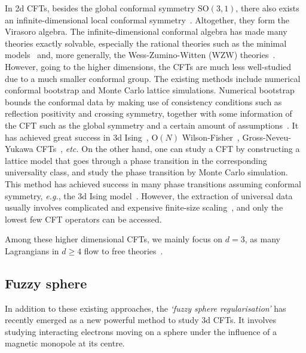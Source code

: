 \documentclass{timesjhep}
\begin{document}
In 2d CFTs, besides the global conformal symmetry $\mathrm{SO}(3,1)$, there also exists an infinite-dimensional local conformal symmetry~\cite{DiFrancesco1997CFT,Ginsparg1988CFT}. Altogether, they form the Virasoro algebra. The infinite-dimensional conformal algebra has made many theories exactly solvable, especially the rational theories such as the minimal models~\cite{Belavin1984BPZ} and, more generally, the Wess-Zumino-Witten (WZW) theories~\cite{Wess1971WZW,Witten1983WZW}. However, going to the higher dimensions, the CFTs are much less well-studied due to a much smaller conformal group. The existing methods include numerical conformal bootstrap and Monte Carlo lattice simulations. Numerical bootstrap bounds the conformal data by making use of consistency conditions such as reflection positivity and crossing symmetry, together with some information of the CFT such as the global symmetry and a certain amount of assumptions~\cite{Poland2018Bootstrap,Rychkov2023Bootstrap}. It has achieved great success in 3d Ising~\cite{ElShowk2012Ising,Kos2016Ising}, $\mathrm{O}(N)$ Wilson-Fisher~\cite{Kos2015ON,Kos2016Ising}, Gross-Neveu-Yukawa CFTs~\cite{Iliesiu2015GNY}, \textit{etc.} On the other hand, one can study a CFT by constructing a lattice model that goes through a phase transition in the corresponding universality class, and study the phase transition by Monte Carlo simulation. This method has achieved success in many phase transitions assuming conformal symmetry, \textit{e.g.}, the 3d Ising model~\cite{Ferrenberg2018IsingMC}. However, the extraction of universal data usually involves complicated and expensive finite-size scaling~\cite{Cardy1996Scaling,Sandvik2010FSS,Fisher1972FSS}, and only the lowest few CFT operators can be accessed.

Among these higher dimensional CFTs, we mainly focus on $d=3$, as many Lagrangians in $d\ge 4$ flow to free theories~\cite{Sachdev2011Quantum}.

\subsection{Fuzzy sphere}

In addition to these existing approaches, the \emph{`fuzzy sphere regularisation'} has recently emerged as a new powerful method to study 3d CFTs. It involves studying interacting electrons moving on a sphere
under the influence of a magnetic monopole at its centre.
\end{document}
